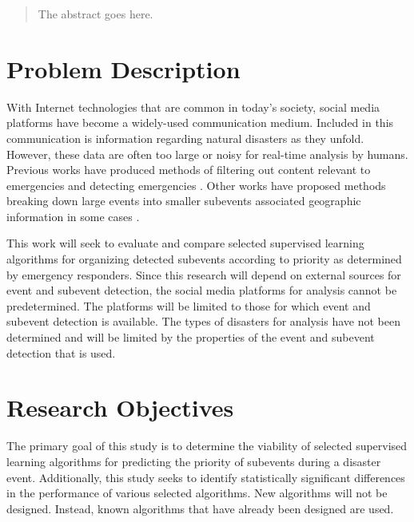 \documentclass[conference]{IEEEtran}
\begin{document}
\begin{abstract}
The abstract goes here.
\end{abstract}





%
\IEEEpeerreviewmaketitle



\section{Problem Description}
With Internet technologies that are common in today’s society, social media platforms have become a widely-used communication medium. Included in this communication is information regarding natural disasters as they unfold. However, these data are often too large or noisy for real-time analysis by humans. Previous works have produced methods of filtering out content relevant to emergencies and detecting emergencies \cite{Avvenuti}. Other works have proposed methods breaking down large events into smaller subevents associated geographic information in some cases \cite{Pohl,Khurdiya,Hua}. 

This work will seek to evaluate and compare selected supervised learning algorithms for organizing detected subevents according to priority as determined by emergency responders. Since this research will depend on external sources for event and subevent detection, the social media platforms for analysis cannot be predetermined. The platforms will be limited to those for which event and subevent detection is available. The types of disasters for analysis have not been determined and will be limited by the properties of the event and subevent detection that is used.


\section{Research Objectives}
The primary goal of this study is to determine the viability of selected supervised learning algorithms for predicting the priority of subevents during a disaster event. Additionally, this study seeks to identify statistically significant differences in the performance of various selected algorithms. New algorithms will not be designed. Instead, known algorithms that have already been designed are used.
\end{document}
